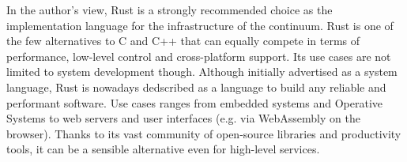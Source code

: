 

In the author's view, Rust is a strongly recommended choice as the implementation language for the infrastructure of the continuum. Rust is one of the few alternatives to C and C++ that can equally compete in terms of performance, low-level control and cross-platform support. Its use cases are not limited to system development though. Although initially advertised as a system language, Rust is nowadays dedscribed as a language to build any reliable and performant software. Use cases ranges from embedded systems and Operative Systems to web servers and user interfaces (e.g. via WebAssembly on the browser). Thanks to its vast community of open-source libraries and productivity tools, it can be a sensible alternative even for high-level services.

